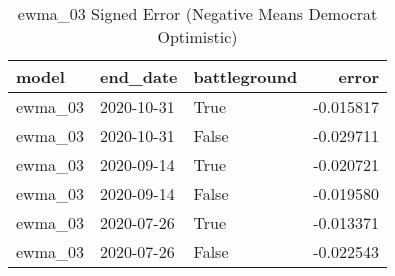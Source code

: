 \begin{table}
\centering
\caption{ewma_03 Signed Error
(Negative Means Democrat Optimistic)}
\begin{tabular}{lllr}
\toprule
   model &    end\_date &  battleground &     error \\
\midrule
 ewma\_03 &  2020-10-31 &          True & -0.015817 \\
 ewma\_03 &  2020-10-31 &         False & -0.029711 \\
 ewma\_03 &  2020-09-14 &          True & -0.020721 \\
 ewma\_03 &  2020-09-14 &         False & -0.019580 \\
 ewma\_03 &  2020-07-26 &          True & -0.013371 \\
 ewma\_03 &  2020-07-26 &         False & -0.022543 \\
\bottomrule
\end{tabular}
\end{table}
